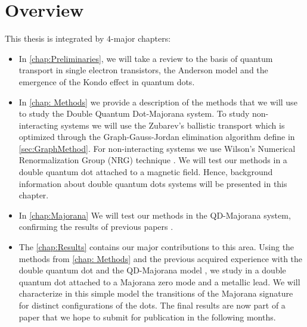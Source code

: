 \section{Overview}

This thesis is integrated by $4$-major chapters:

\begin{itemize}
\item In  \ref{chap:Preliminaries}, we will take a review to the basis of quantum transport in single electron transistors, the Anderson model and the emergence of the Kondo effect in quantum dots. 

 \item In \ref{chap: Methods} we provide a description of the methods that we will use to study the Double Quantum Dot-Majorana system. To study non-interacting systems we will use the Zubarev's ballistic transport\cite{zubarev_double-time_1960} which is optimized through the Graph-Gauss-Jordan elimination algorithm define in \ref{sec:GraphMethod}. For non-interacting systems we use Wilson's Numerical Renormalization Group (NRG) technique \citep{wilson_renormalization_1975}. We will test our methods in a double quantum dot attached to a magnetic field. Hence, background information about double quantum dots systems will be presented in this chapter. 

\item In \ref{chap:Majorana} We will test our methods in the QD-Majorana system, confirming the results of previous papers \cite{dias_da_silva_transmission_2008,liu_detecting_2011} .


\item The  \ref{chap:Results}  contains our major contributions to  this area. Using the methods from \ref{chap: Methods} and the previous acquired experience with the double quantum dot and the QD-Majorana model , we study in a  double quantum dot attached to a Majorana zero mode and a metallic lead. We will characterize in this simple model the transitions of the Majorana signature for distinct configurations of the dots. The final results are now part of a paper that we hope to submit for publication in the following months. 
\end{itemize}
 







